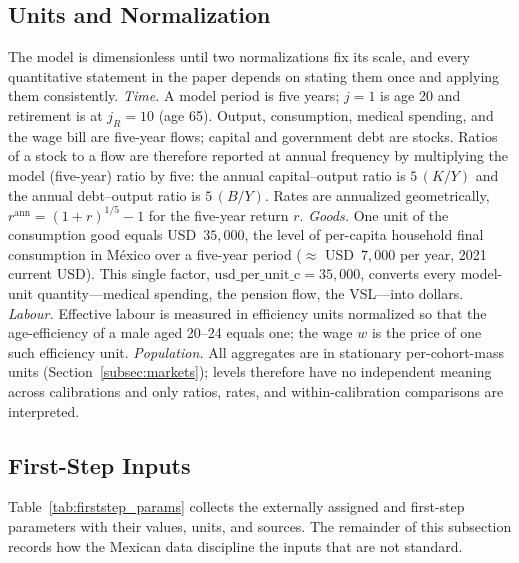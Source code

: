 \documentclass[12pt,a4paper]{article}
\begin{document}
\subsection{Units and Normalization}
\label{subsec:units}

The model is dimensionless until two normalizations fix its scale, and every quantitative statement in the paper depends on stating them once and applying them consistently. \emph{Time.} A model period is five years; $j=1$ is age 20 and retirement is at $j_R=10$ (age 65). Output, consumption, medical spending, and the wage bill are five-year flows; capital and government debt are stocks. Ratios of a stock to a flow are therefore reported at annual frequency by multiplying the model (five-year) ratio by five: the annual capital--output ratio is $5\,(K/Y)$ and the annual debt--output ratio is $5\,(B/Y)$. Rates are annualized geometrically, $r^{\mathrm{ann}}=(1+r)^{1/5}-1$ for the five-year return $r$. \emph{Goods.} One unit of the consumption good equals USD~$35{,}000$, the level of per-capita household final consumption in M\'exico over a five-year period ($\approx$ USD~$7{,}000$ per year, 2021 current USD). This single factor, $\text{usd\_per\_unit\_c}=35{,}000$, converts every model-unit quantity---medical spending, the pension flow, the VSL---into dollars. \emph{Labour.} Effective labour is measured in efficiency units normalized so that the age-efficiency of a male aged 20--24 equals one; the wage $w$ is the price of one such efficiency unit. \emph{Population.} All aggregates are in stationary per-cohort-mass units (Section~\ref{subsec:markets}); levels therefore have no independent meaning across calibrations and only ratios, rates, and within-calibration comparisons are interpreted.

\subsection{First-Step Inputs}
\label{sec:data}
\label{subsec:firststep}

Table~\ref{tab:firststep_params} collects the externally assigned and first-step parameters with their values, units, and sources. The remainder of this subsection records how the Mexican data discipline the inputs that are not standard.
\end{document}
